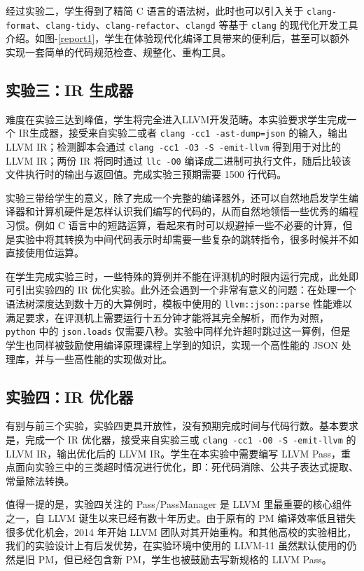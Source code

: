 \documentclass{SCIS2020cn}
\begin{document}
经过实验二，学生得到了精简 C 语言的语法树，此时也可以引入关于 \texttt{clang-format}、\texttt{clang-tidy}、\texttt{clang-refactor}、\texttt{clangd} 等基于 \texttt{clang} 的现代化开发工具介绍。如图-\ref{report1}，学生在体验现代化编译工具带来的便利后，甚至可以额外实现一套简单的代码规范检查、规整化、重构工具。

\subsection{实验三：IR 生成器}

难度在实验三达到峰值，学生将完全进入LLVM开发范畴。本实验要求学生完成一个 IR生成器，接受来自实验二或者 \texttt{clang -cc1 -ast-dump=json} 的输入，输出 LLVM IR；检测脚本会通过 \texttt{clang -cc1 -O3 -S -emit-llvm} 得到用于对比的 LLVM IR；两份 IR 将同时通过 \texttt{llc -O0} 编译成二进制可执行文件，随后比较该文件执行时的输出与返回值。完成实验三预期需要 1500 行代码。

实验三带给学生的意义，除了完成一个完整的编译器外，还可以自然地启发学生编译器和计算机硬件是怎样认识我们编写的代码的，从而自然地领悟一些优秀的编程习惯。例如 C 语言中的短路运算，看起来有时可以规避掉一些不必要的计算，但是实验中将其转换为中间代码表示时却需要一些复杂的跳转指令，很多时候并不如直接使用位运算。

在学生完成实验三时，一些特殊的算例并不能在评测机的时限内运行完成，此处即可引出实验四的 IR 优化实验。此外还会遇到一个非常有意义的问题：在处理一个语法树深度达到数十万的大算例时，模板中使用的 \texttt{llvm::json::parse} 性能难以满足要求，在评测机上需要运行十五分钟才能将其完全解析，而作为对照，\texttt{python} 中的 \texttt{json.loads} 仅需要八秒。实验中同样允许超时跳过这一算例，但是学生也同样被鼓励使用编译原理课程上学到的知识，实现一个高性能的 JSON 处理库，并与一些高性能的实现做对比。

\subsection{实验四：IR 优化器}
有别与前三个实验，实验四更具开放性，没有预期完成时间与代码行数。基本要求是，完成一个 IR 优化器，接受来自实验三或 \texttt{clang -cc1 -O0 -S -emit-llvm} 的 LLVM IR，输出优化后的 LLVM IR。学生在本实验中需要编写 LLVM Pass，重点面向实验三中的三类超时情况进行优化，即：死代码消除、公共子表达式提取、常量除法转换。

值得一提的是，实验四关注的 Pass/PassManager 是 LLVM 里最重要的核心组件之一，自 LLVM 诞生以来已经有数十年历史。由于原有的 PM 编译效率低且错失很多优化机会，2014 年开始 LLVM 团队对其开始重构。和其他高校的实验相比，我们的实验设计上有后发优势，在实验环境中使用的 LLVM-11 虽然默认使用的仍然是旧 PM，但已经包含新 PM，学生也被鼓励去写新规格的 LLVM Pass。
\end{document}
